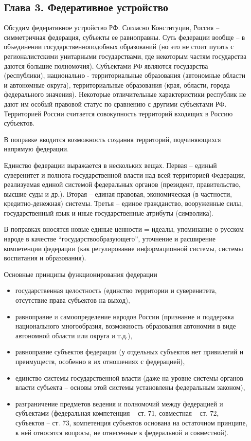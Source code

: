 \documentclass[a4paper, 12pt]{article}
\begin{document}
\subsection{Глава 3. Федеративное устройство}
Обсудим федеративное устройство РФ. Согласно Конституции, Россия -- симметричная федерация, субъекты ее равноправны. Суть федерации вообще -- в объединении государственноподобных образований (но это не стоит путать с регионалистскими унитарными государствами, где некоторым частям государства даются большие полномочия). Субъектами РФ являются государства (республики), национально \!\!-\!\! территориальные образования (автономные области и автономные округа), территориальные образования (края, области, города федерального значения). Некоторые отличительные характеристики республик не дают им особый правовой статус по сравнению с другими субъектами РФ. Территорией России считается совокупность территорий входящих в Россию субъектов. 

В поправке вводится возможность создания территорий, подчиняющихся напрямую федерации. 

Единство федерации выражается в нескольких вещах. Первая -- единый суверенитет и полнота государственной власти над всей территорией Федерации, реализуемая единой системой федеральных органов (президент, правительство, высшие суды и др.). Вторая -- единая правовая, экономическая (в частности, кредитно-денежная) системы. Третья -- единое гражданство, вооруженные силы, государственный язык и иные государственные атрибуты (символика). 

В поправках вносятся новые единые ценности = идеалы, упоминание о русском народе в качестве ``государствообразующего'', уточнение и расширение компетенции федерации (как регулирование информационной системы, системы воспитания и образования). 

Основные принципы функционирования федерации 
\begin{itemize}
\item государственная целостность (единство территории и суверенитета, отсутствие права субъектов на выход),
\item равноправие и самоопределение народов России (признание и поддержка национального многообразия, возможность образования автономии в виде автономной области или округа и т.д.),
\item равноправие субъектов федерации (у отдельных субъектов нет привилегий и преимуществ, особенно в их отношениях с федерацией),
\item единство системы государственной власти (даже на уровне системы органов власти субъекта -- основы этой системы установлены федеральным законом), 
\item разграничение предметов ведения и полномочий между федерацией и субъектами (федеральная компетенция -- ст. 71, совместная -- ст. 72, субъектов -- ст. 73, компетенция субъектов основана на остаточном принципе, к ней относятся вопросы, не отнесенные к федеральной и совместной). 
\end{itemize}
\end{document}

